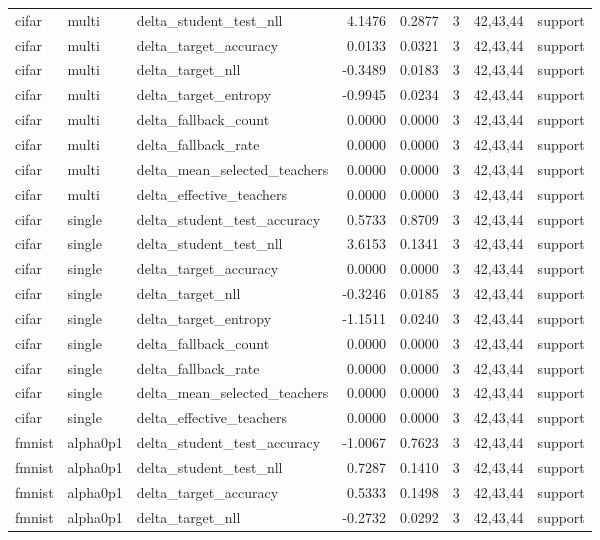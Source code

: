 \begin{tabular}{lllrrrll}
cifar & multi & delta\_student\_test\_nll & 4.1476 & 0.2877 & 3 & 42,43,44 & support \\
cifar & multi & delta\_target\_accuracy & 0.0133 & 0.0321 & 3 & 42,43,44 & support \\
cifar & multi & delta\_target\_nll & -0.3489 & 0.0183 & 3 & 42,43,44 & support \\
cifar & multi & delta\_target\_entropy & -0.9945 & 0.0234 & 3 & 42,43,44 & support \\
cifar & multi & delta\_fallback\_count & 0.0000 & 0.0000 & 3 & 42,43,44 & support \\
cifar & multi & delta\_fallback\_rate & 0.0000 & 0.0000 & 3 & 42,43,44 & support \\
cifar & multi & delta\_mean\_selected\_teachers & 0.0000 & 0.0000 & 3 & 42,43,44 & support \\
cifar & multi & delta\_effective\_teachers & 0.0000 & 0.0000 & 3 & 42,43,44 & support \\
cifar & single & delta\_student\_test\_accuracy & 0.5733 & 0.8709 & 3 & 42,43,44 & support \\
cifar & single & delta\_student\_test\_nll & 3.6153 & 0.1341 & 3 & 42,43,44 & support \\
cifar & single & delta\_target\_accuracy & 0.0000 & 0.0000 & 3 & 42,43,44 & support \\
cifar & single & delta\_target\_nll & -0.3246 & 0.0185 & 3 & 42,43,44 & support \\
cifar & single & delta\_target\_entropy & -1.1511 & 0.0240 & 3 & 42,43,44 & support \\
cifar & single & delta\_fallback\_count & 0.0000 & 0.0000 & 3 & 42,43,44 & support \\
cifar & single & delta\_fallback\_rate & 0.0000 & 0.0000 & 3 & 42,43,44 & support \\
cifar & single & delta\_mean\_selected\_teachers & 0.0000 & 0.0000 & 3 & 42,43,44 & support \\
cifar & single & delta\_effective\_teachers & 0.0000 & 0.0000 & 3 & 42,43,44 & support \\
fmnist & alpha0p1 & delta\_student\_test\_accuracy & -1.0067 & 0.7623 & 3 & 42,43,44 & support \\
fmnist & alpha0p1 & delta\_student\_test\_nll & 0.7287 & 0.1410 & 3 & 42,43,44 & support \\
fmnist & alpha0p1 & delta\_target\_accuracy & 0.5333 & 0.1498 & 3 & 42,43,44 & support \\
fmnist & alpha0p1 & delta\_target\_nll & -0.2732 & 0.0292 & 3 & 42,43,44 & support \\

\end{tabular}

